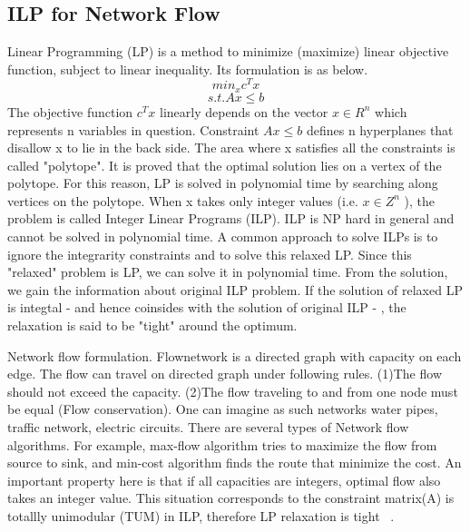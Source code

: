 \documentclass[10pt,twocolumn,letterpaper]{article}
\begin{document}
\subsection{ILP for Network Flow}
\label{ILP formulation}
Linear Programming (LP) is a method to minimize (maximize) linear objective function, subject to linear inequality. Its formulation is as below.
\[
min_{x} 　c^{T}x
\]
\[
s.t. Ax \leq b
\]
The objective function \(c^{T}x\) linearly depends on the vector \(x \in R^{n}\) which represents n variables in question. Constraint \(Ax \leq b\) defines n hyperplanes that disallow x to lie in the back side. The area where x satisfies all the constraints is called "polytope". It is proved that the optimal solution lies on a vertex of the polytope. For this reason, LP is solved in polynomial time by searching along vertices on the polytope.
When x takes only integer values (i.e. \(x \in Z^{n}\) ), the problem is called Integer Linear Programs (ILP). ILP is NP hard in general and cannot be solved in polynomial time. 
A common approach to solve ILPs is to ignore the integrarity constraints and to solve this relaxed LP. Since this "relaxed" problem is LP, we can solve it in polynomial time. From the solution, we gain the information about original ILP problem.
If the solution of relaxed LP is integtal - and hence coinsides with the solution of original ILP - , the relaxation is said to be "tight" around the optimum.

Network flow formulation.
Flownetwork is a directed graph with capacity on each edge. The flow can travel on directed graph under following rules. (1)The flow should not exceed the capacity. (2)The flow traveling to and from one node must be equal (Flow conservation). One can imagine as such networks water pipes, traffic network, electric circuits. There are several types of Network flow algorithms. For example, max-flow algorithm tries to maximize the flow from source to sink, and min-cost algorithm finds the route that minimize the cost. An important property here is that if all capacities are integers, optimal flow also takes an integer value. This situation corresponds to the constraint matrix(A) is totallly unimodular (TUM) in ILP, therefore LP relaxation is tight ~\cite{Bertsekas}.
\end{document}
